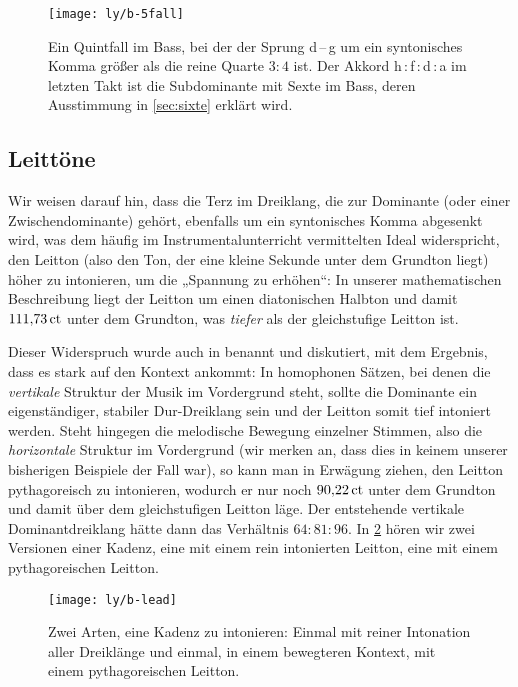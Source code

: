 \begin{figure}
  \centering
  \texttt{[image: ly/b-5fall]}
  \caption{Ein Quintfall im Bass, bei der der Sprung d\,–\,\naturalp g um ein
    syntonisches Komma größer als die reine Quarte $3:4$ ist.  Der Akkord
    h\,:\,\naturalp f\,:\,d\,:\,a im letzten Takt ist die Subdominante mit Sexte
    im Bass, deren Ausstimmung in \cref{sec:sixte} erklärt wird.}\label{fig:5fall}
\end{figure}

\subsection{Leittöne}
\label{sec:ln}

Wir weisen darauf hin, dass die Terz im Dreiklang, die zur Dominante (oder einer
Zwischendominante) gehört, ebenfalls um ein syntonisches Komma abgesenkt wird,
was dem häufig im Instrumentalunterricht vermittelten Ideal widerspricht, den
Leitton (also den Ton, der eine kleine Sekunde unter dem Grundton liegt) höher
zu intonieren, um die „Spannung zu erhöhen“: In unserer mathematischen
Beschreibung liegt der Leitton um einen diatonischen Halbton und damit
$111{,}73\,\text{ct}$ unter dem Grundton, was \emph{tiefer} als der gleichstufige
Leitton ist.

Dieser Widerspruch wurde auch in \cite[211]{viitasaari} benannt und
diskutiert, mit dem Ergebnis, dass es stark auf den Kontext ankommt: In
homophonen Sätzen, bei denen die \emph{vertikale} Struktur der Musik im
Vordergrund steht, sollte die Dominante ein eigenständiger, stabiler
Dur-Dreiklang sein und der Leitton somit tief intoniert werden. Steht hingegen
die melodische Bewegung einzelner Stimmen, also die \emph{horizontale} Struktur
im Vordergrund (wir merken an, dass dies in keinem unserer bisherigen Beispiele
der Fall war), so kann man in Erwägung ziehen, den Leitton pythagoreisch zu
intonieren, wodurch er nur noch $90{,}22\,\text{ct}$ unter dem Grundton und damit über
dem gleichstufigen Leitton läge. Der entstehende vertikale Dominantdreiklang
hätte dann das Verhältnis $64:81:96$. In \cref{fig:lead} hören wir zwei
Versionen einer Kadenz, eine mit einem rein intonierten Leitton, eine mit einem
pythagoreischen Leitton.

\begin{figure}
  \centering
  \texttt{[image: ly/b-lead]}
  \caption{Zwei Arten, eine Kadenz zu intonieren: Einmal mit reiner
    Intonation aller Dreiklänge und einmal, in einem bewegteren Kontext, mit
    einem pythagoreischen Leitton.}\label{fig:lead}
\end{figure}


